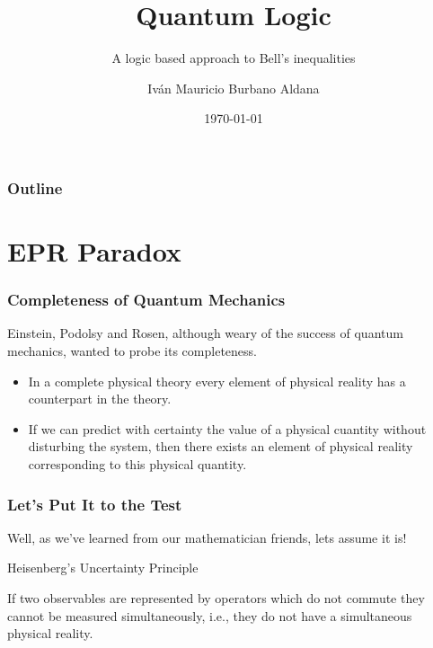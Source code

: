 \documentclass{beamer}
\title{Quantum Logic}
\subtitle{A logic based approach to Bell's inequalities\cite{Burbano2017}}
\author[Iván Burbano]{Iván Mauricio Burbano Aldana}
\institute{Universidad de los Andes}
\date{\today}
\begin{document}
\begin{frame}

	\titlepage

\end{frame}

\begin{frame}

	\frametitle{Outline}
	\tableofcontents

\end{frame}

\section{EPR Paradox}

\begin{frame}

	\frametitle{Completeness of Quantum Mechanics}
	
	Einstein, Podolsy and Rosen, although weary of the success of quantum mechanics, wanted to probe its completeness\cite{Einstein1935}.
	
	\begin{itemize}
		
		\item In a complete physical theory every element of physical reality has a counterpart in the theory.		
		
		\item If we can predict with certainty the value of a physical cuantity without disturbing the system, then there exists an element of physical reality corresponding to this physical quantity.
		
	\end{itemize}

\end{frame}

\begin{frame}

	\frametitle{Let's Put It to the Test}

	Well, as we've learned from our mathematician friends, lets assume it is!
	
	\begin{block}{Heisenberg's Uncertainty Principle}

		If two observables are represented by operators which do not commute they cannot be measured simultaneously, i.e., they do not have a simultaneous physical reality\cite{Hall2013}.

	\end{block}	

\end{frame}
\end{document}
